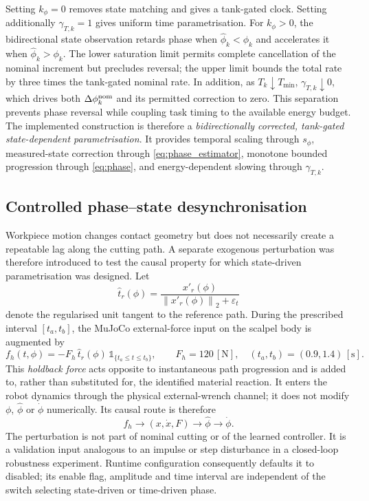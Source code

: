 \documentclass[11pt,a4paper]{article}
\newcommand{\norm}[1]{\left\lVert#1\right\rVert}
\newcommand{\unit}[1]{\,[\mathrm{#1}]}
\begin{document}
Setting $k_\phi=0$ removes state matching and gives a tank-gated clock.
Setting additionally $\gamma_{T,k}=1$ gives uniform time parametrisation.
For $k_\phi>0$, the bidirectional state observation retards phase when
$\hat\phi_k<\phi_k$ and accelerates it when $\hat\phi_k>\phi_k$.  The lower
saturation limit permits complete cancellation of the nominal increment but
precludes reversal; the upper limit bounds the total rate by three times the
tank-gated nominal rate.  In addition, as $T_k\downarrow T_{\min}$,
$\gamma_{T,k}\downarrow0$, which drives both
$\Delta\phi_k^{\rm nom}$ and its permitted correction to zero.  This
separation prevents phase reversal while coupling task timing to the available
energy budget.  The implemented construction is therefore a
\emph{bidirectionally corrected, tank-gated state-dependent parametrisation}.  It
provides temporal scaling through $s_\phi$, measured-state correction through
\eqref{eq:phase_estimator}, monotone bounded progression through
\eqref{eq:phase}, and energy-dependent slowing through $\gamma_{T,k}$.

\subsection{Controlled phase--state desynchronisation}
\label{sec:holdback}
Workpiece motion changes contact geometry but does not necessarily create a
repeatable lag along the cutting path.  A separate exogenous perturbation was
therefore introduced to test the causal property for which state-driven
parametrisation was designed.  Let
\begin{equation}
\hat t_r(\phi)=
\frac{x'_r(\phi)}{\norm{x'_r(\phi)}_2+\varepsilon_t}
\label{eq:path_tangent_unit}
\end{equation}
denote the regularised unit tangent to the reference path.  During the
prescribed interval $[t_a,t_b]$, the MuJoCo external-force input on the scalpel
body is augmented by
\begin{equation}
f_h(t,\phi)=
-F_h\,\hat t_r(\phi)\,
\mathbb 1_{\{t_a\leq t\leq t_b\}},
\qquad
F_h=120\unit{N},\quad
(t_a,t_b)=(0.9,1.4)\unit{s}.
\label{eq:holdback_force}
\end{equation}
This \emph{holdback force} acts opposite to instantaneous path progression and
is added to, rather than substituted for, the identified material reaction.
It enters the robot dynamics through the physical external-wrench channel; it
does not modify $\phi$, $\hat\phi$ or $\dot\phi$ numerically.  Its causal route
is therefore
\[
f_h\longrightarrow(x,\dot x,F)
\longrightarrow\hat\phi
\longrightarrow\dot\phi .
\]
The perturbation is not part of nominal cutting or of the learned controller.
It is a validation input analogous to an impulse or step disturbance in a
closed-loop robustness experiment.  Runtime configuration consequently
defaults it to disabled; its enable flag, amplitude and time interval are
independent of the switch selecting state-driven or time-driven phase.
\end{document}
